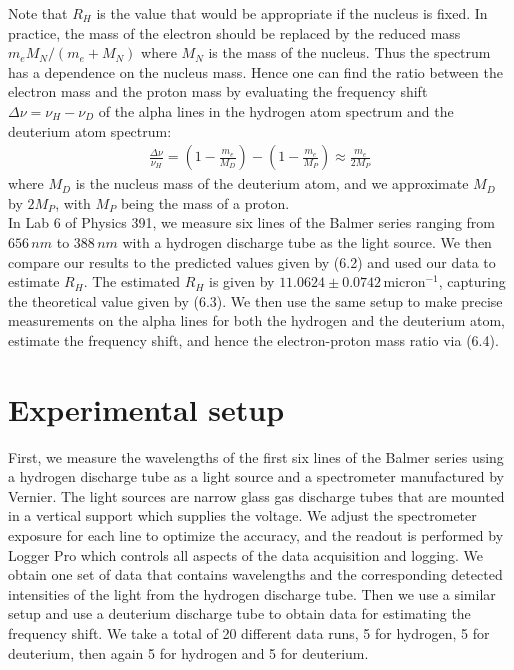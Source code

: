 \documentclass[11pt]{book}
\theoremstyle{break}
\theoremstyle{break}
\begin{document}
Note that $R_H$ is the value that would be appropriate if the nucleus is fixed. In practice, the mass of the electron should be replaced by the reduced mass $m_eM_N /(m_e+M_N)$ where $M_N$ is the mass of the nucleus. Thus the spectrum has a dependence on the nucleus mass. Hence one can find the ratio between the electron mass and the proton mass by evaluating the frequency shift $\Delta \nu = \nu_H - \nu_D$ of the alpha lines in the hydrogen atom spectrum and the deuterium atom spectrum:
\begin{align}
\frac{\Delta \nu}{\nu_H} = \left( 1 - \frac{m_e}{M_D}\right) - \left( 1 - \frac{m_e}{M_P}\right) \approx \frac{m_e}{2M_P}
\end{align}
where $M_D$ is the nucleus mass of the deuterium atom, and we approximate $M_D$ by $2M_P$, with $M_P$ being the mass of a proton. \\

In Lab 6 of Physics 391, we measure six lines of the Balmer series ranging from $656\, nm$ to $388\, nm$ with a hydrogen discharge tube as the light source. We then compare our results to the predicted values given by (6.2) and used our data to estimate $R_H$. The estimated $R_H$ is given by $11.0624 \pm 0.0742 \, \text{micron}^{-1}$, capturing the theoretical value given by (6.3). We then use the same setup to make precise measurements on the alpha lines for both the hydrogen and the deuterium atom, estimate the frequency shift, and hence the electron-proton mass ratio via (6.4).\\


\hfill\break
\section{Experimental setup} 
First, we measure the wavelengths of the first six lines of the Balmer series using a hydrogen discharge tube as a light source and a spectrometer manufactured by Vernier. The light sources are narrow glass gas discharge tubes that are mounted in a vertical support which supplies the voltage. We adjust the spectrometer exposure for each line to optimize the accuracy, and the readout is performed by Logger Pro which controls all aspects of the data acquisition and logging. We obtain one set of data that contains wavelengths and the corresponding detected intensities of the light from the hydrogen discharge tube. Then we use a similar setup and use a deuterium discharge tube to obtain data for estimating the frequency shift. We take a total of 20 different data runs, 5 for hydrogen, 5 for deuterium, then again 5 for hydrogen and 5 for deuterium.\\
\end{document}
